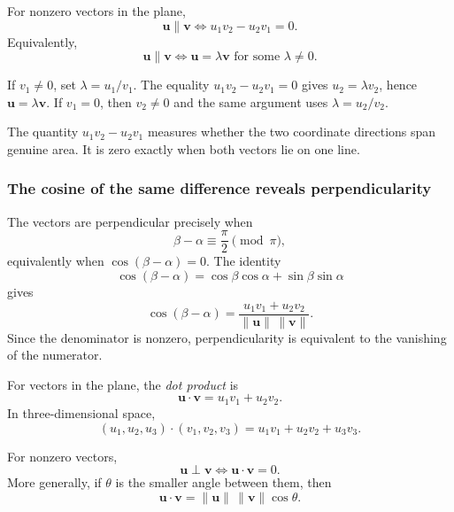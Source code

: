 \begin{theorembox}
For nonzero vectors in the plane,
\[
\boxed{
\mathbf u\parallel\mathbf v
\iff
u_1v_2-u_2v_1=0
}.
\]
Equivalently,
\[
\boxed{
\mathbf u\parallel\mathbf v
\iff
\mathbf u=\lambda\mathbf v
\text{ for some }\lambda\neq0
}.
\]
\end{theorembox}

\begin{proofbox}
If $v_1\neq0$, set $\lambda=u_1/v_1$. The equality
$u_1v_2-u_2v_1=0$ gives $u_2=\lambda v_2$, hence
$\mathbf u=\lambda\mathbf v$. If $v_1=0$, then $v_2\neq0$ and the same argument
uses $\lambda=u_2/v_2$.
\end{proofbox}

\begin{interpretationbox}
The quantity $u_1v_2-u_2v_1$ measures whether the two coordinate directions
span genuine area. It is zero exactly when both vectors lie on one line.
\end{interpretationbox}

\subsubsection{The cosine of the same difference reveals perpendicularity}

\begin{derivationbox}
The vectors are perpendicular precisely when
\[
\beta-\alpha\equiv\frac{\pi}{2}\pmod{\pi},
\]
equivalently when $\cos(\beta-\alpha)=0$. The identity
\[
\cos(\beta-\alpha)
=
\cos\beta\cos\alpha+\sin\beta\sin\alpha
\]
gives
\[
\cos(\beta-\alpha)
=
\frac{u_1v_1+u_2v_2}{\|\mathbf u\|\,\|\mathbf v\|}.
\]
Since the denominator is nonzero, perpendicularity is equivalent to the
vanishing of the numerator.
\end{derivationbox}

\begin{definitionbox}
For vectors in the plane, the \emph{dot product} is
\[
\boxed{
\mathbf u\cdot\mathbf v=u_1v_1+u_2v_2
}.
\]
In three-dimensional space,
\[
\boxed{
(u_1,u_2,u_3)\cdot(v_1,v_2,v_3)
=u_1v_1+u_2v_2+u_3v_3
}.
\]
\end{definitionbox}

\begin{theorembox}
For nonzero vectors,
\[
\boxed{
\mathbf u\perp\mathbf v
\iff
\mathbf u\cdot\mathbf v=0
}.
\]
More generally, if $\theta$ is the smaller angle between them, then
\[
\boxed{
\mathbf u\cdot\mathbf v
=
\|\mathbf u\|\,\|\mathbf v\|\cos\theta
}.
\]
\end{theorembox}

